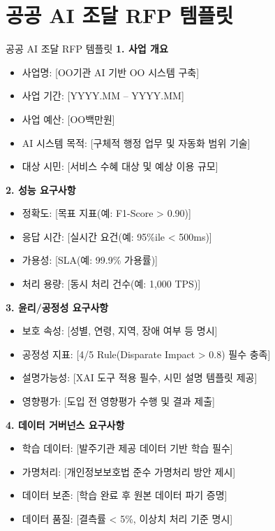 \section{공공 AI 조달 RFP 템플릿}
\label{sec:18.5}

\begin{practicaltool}{공공 AI 조달 RFP 템플릿}
\textbf{1. 사업 개요}
\begin{itemize}
    \item 사업명: [OO기관 AI 기반 OO 시스템 구축]
    \item 사업 기간: [YYYY.MM -- YYYY.MM]
    \item 사업 예산: [OO백만원]
    \item AI 시스템 목적: [구체적 행정 업무 및 자동화 범위 기술]
    \item 대상 시민: [서비스 수혜 대상 및 예상 이용 규모]
\end{itemize}

\textbf{2. 성능 요구사항}
\begin{itemize}
    \item 정확도: [목표 지표(예: F1-Score > 0.90)]
    \item 응답 시간: [실시간 요건(예: 95\%ile < 500ms)]
    \item 가용성: [SLA(예: 99.9\% 가용률)]
    \item 처리 용량: [동시 처리 건수(예: 1,000 TPS)]
\end{itemize}

\textbf{3. 윤리/공정성 요구사항}
\begin{itemize}
    \item 보호 속성: [성별, 연령, 지역, 장애 여부 등 명시]
    \item 공정성 지표: [4/5 Rule(Disparate Impact > 0.8) 필수 충족]
    \item 설명가능성: [XAI 도구 적용 필수, 시민 설명 템플릿 제공]
    \item 영향평가: [도입 전 영향평가 수행 및 결과 제출]
\end{itemize}

\textbf{4. 데이터 거버넌스 요구사항}
\begin{itemize}
    \item 학습 데이터: [발주기관 제공 데이터 기반 학습 필수]
    \item 가명처리: [개인정보보호법 준수 가명처리 방안 제시]
    \item 데이터 보존: [학습 완료 후 원본 데이터 파기 증명]
    \item 데이터 품질: [결측률 < 5\%, 이상치 처리 기준 명시]
\end{itemize}


\end{practicaltool}
